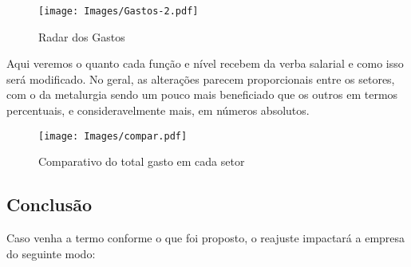 \documentclass[a4paper, 12pt]{CSSullivanBusinessReport}
\begin{document}
\begin{fullwidth}


\vspace{-0.5cm}
\begin{figure*}[H] 
	\texttt{[image: Images/Gastos-2.pdf]}
	\caption{Radar dos Gastos}
	\label{fig:gastos} 
 \end{figure*}

\vspace{-0.7cm}
Aqui veremos o quanto cada função e nível recebem da verba salarial e como isso será modificado. No geral, as alterações parecem proporcionais entre os setores, com o da metalurgia sendo um pouco mais beneficiado que os outros em termos percentuais, e consideravelmente mais, em números absolutos. 


\begin{figure*}[H] 
	\texttt{[image: Images/compar.pdf]}
	\caption{Comparativo do total gasto em cada setor}
	\label{fig:comparsetor} 
 \end{figure*}
\vspace{-0.7cm}

\subsection{Conclusão}
\vspace{-0.4cm}
Caso venha a termo conforme o que foi proposto, o reajuste impactará a empresa do seguinte modo:


\end{fullwidth}
\end{document}
